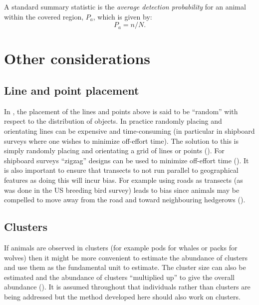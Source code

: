 A standard summary statistic is the \textit{average detection probability} for an animal within the covered region, $P_a$, which is given by:
\begin{equation*}
P_a = n/N.
\end{equation*}

\section{Other considerations}

\subsection{Line and point placement}
In , the placement of the lines and points above is said to be ``random'' with respect to the distribution of objects. In practice randomly placing and orientating lines can be expensive and time-consuming (in particular in shipboard surveys where one wishes to minimize off-effort time). The solution to this is simply randomly placing and orientating a grid of lines or points (\cite[p. 2]{IDS}). For shipboard surveys ``zigzag'' designs can be used to minimize off-effort time (\cite{strindberg04}). It is also important to ensure that transects to not run parallel to geographical features as doing this will incur bias. For example using roads as transects (as was done in the US breeding bird survey) leads to bias since animals may be compelled to move away from the road and toward neighbouring hedgerows (\cite[p. 18]{IDS}).

\subsection{Clusters}
If animals are observed in clusters (for example pods for whales or packs for wolves) then it might be more convenient to estimate the abundance of clusters and use them as the fundamental unit to estimate. The cluster size can also be estimated and the abundance of clusters ``multiplied up'' to give the overall abundance (\cite[p. 13]{IDS}). It is assumed throughout that individuals rather than clusters are being addressed but the method developed here should also work on clusters.

